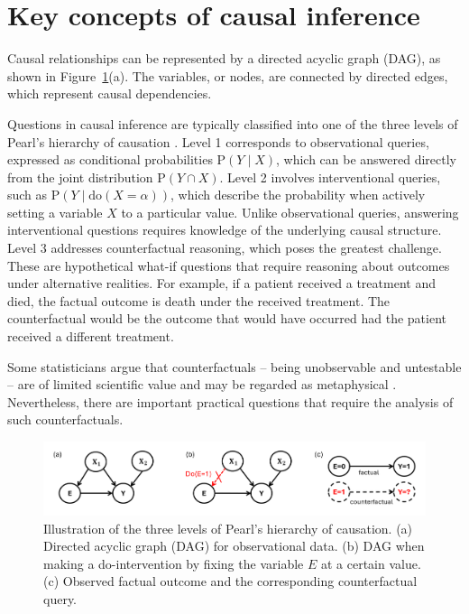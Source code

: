 \section{Key concepts of causal inference}

Causal relationships can be represented by a directed acyclic graph (DAG), as shown in Figure~\ref{fig:pearl_levels}(a). The variables, or nodes, are connected by directed edges, which represent causal dependencies.

Questions in causal inference are typically classified into one of the three levels of Pearl's hierarchy of causation \citep{pearl_book2009}. Level 1 corresponds to observational queries, expressed as conditional probabilities $\text{P}(Y \mid X)$, which can be answered directly from the joint distribution $\text{P}(Y \cap X)$. Level 2 involves interventional queries, such as $\text{P}(Y \mid \text{do}(X = \alpha))$, which describe the probability when actively setting a variable $X$ to a particular value. Unlike observational queries, answering interventional questions requires knowledge of the underlying causal structure. Level 3 addresses counterfactual reasoning, which poses the greatest challenge. These are hypothetical what-if questions that require reasoning about outcomes under alternative realities. For example, if a patient received a treatment and died, the factual outcome is death under the received treatment. The counterfactual would be the outcome that would have occurred had the patient received a different treatment.

 
Some statisticians argue that counterfactuals -- being unobservable and untestable -- are of limited scientific value and may be regarded as metaphysical \citep{dawid2000}. Nevertheless, there are important practical questions that require the analysis of such counterfactuals.



\begin{figure}[H]
\centering
\includegraphics[width=1\textwidth]{img/pearl_levels.png}
\caption{Illustration of the three levels of Pearl's hierarchy of causation. (a) Directed acyclic graph (DAG) for observational data. (b) DAG when making a do-intervention by fixing the variable $E$ at a certain value. (c) Observed factual outcome and the corresponding counterfactual query.}
\label{fig:pearl_levels}
\end{figure}


